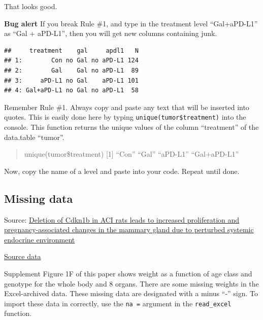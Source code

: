 \documentclass[]{book}
\begin{document}
That looks good.

\textbf{Bug alert} If you break Rule \#1, and type in the treatment level ``Gal+aPD-L1'' as ``Gal + aPD-L1'', then you will get new columns containing junk.

\begin{verbatim}
##     treatment    gal     apdl1   N
## 1:        Con no Gal no aPD-L1 124
## 2:        Gal    Gal no aPD-L1  89
## 3:     aPD-L1 no Gal    aPD-L1 101
## 4: Gal+aPD-L1 no Gal no aPD-L1  58
\end{verbatim}

Remember Rule \#1. Always copy and paste any text that will be inserted into quotes. This is easily done here by typing \texttt{unique(tumor\$treatment)} into the console. This function returns the unique values of the column ``treatment'' of the data.table ``tumor''.

\begin{quote}
unique(tumor\$treatment)
{[}1{]} ``Con'' ``Gal'' ``aPD-L1'' ``Gal+aPD-L1''
\end{quote}

Now, copy the name of a level and paste into your code. Repeat until done.

\hypertarget{missing-data}{%
\subsection{Missing data}\label{missing-data}}

Source: \href{https://journals.plos.org/plosgenetics/article?id=10.1371/journal.pgen.1008002}{Deletion of Cdkn1b in ACI rats leads to increased proliferation and pregnancy-associated changes in the mammary gland due to perturbed systemic endocrine environment}

\href{https://doi.org/10.1371/journal.pgen.1008002.s008}{Source data}

Supplement Figure 1F of this paper shows weight as a function of age class and genotype for the whole body and 8 organs. There are some missing weights in the Excel-archived data. These missing data are designated with a minus ``-'' sign. To import these data in correctly, use the \texttt{na\ =} argument in the \texttt{read\_excel} function.
\end{document}

